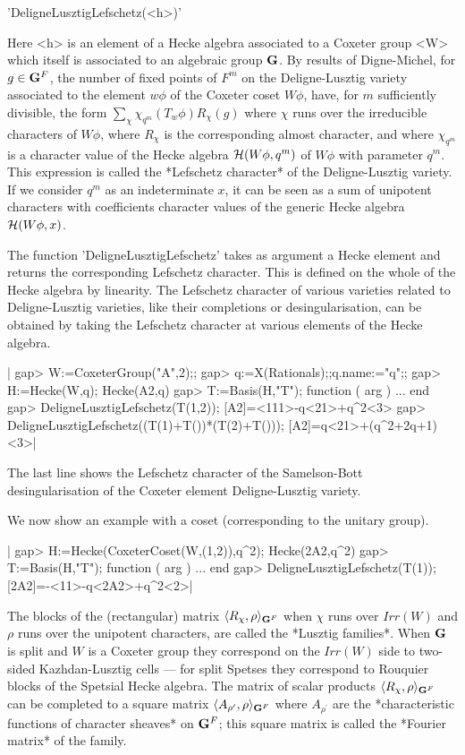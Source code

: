 'DeligneLusztigLefschetz(<h>)'

Here <h> is an element of a Hecke algebra associated to a Coxeter group <W>
which  itself  is  associated  to  an  algebraic group ${\bf G}$. By results of
Digne-Michel,  for $g\in{\bf G}^F$, the number of  fixed points of $F^m$ on the
Deligne-Lusztig  variety associated to  the element $w\phi$  of the Coxeter
coset  $W\phi$, have, for  $m$ sufficiently divisible,  the form $\sum_\chi
\chi_{q^m}(T_w\phi)R_\chi(g)$   where  $\chi$  runs  over  the  irreducible
characters   of  $W\phi$,  where  $R_\chi$   is  the  corresponding  almost
character, and where $\chi_{q^m}$ is a character value of the Hecke algebra
${\cal  H}(W\phi,q^m)$ of $W\phi$ with  parameter $q^m$. This expression is
called  the  *Lefschetz  character*  of  the Deligne-Lusztig variety. If we
consider  $q^m$  as  an  indeterminate  $x$,  it  can  be  seen as a sum of
unipotent  characters  with  coefficients  character  values of the generic
Hecke algebra ${\cal H}(W\phi,x)$.

The  function 'DeligneLusztigLefschetz'  takes as  argument a Hecke element
and  returns the corresponding Lefschetz character.  This is defined on the
whole of the Hecke algebra by linearity. The Lefschetz character of various
varieties  related to Deligne-Lusztig varieties,  like their completions or
desingularisation,  can be  obtained by  taking the  Lefschetz character at
various elements of the Hecke algebra.

|    gap> W:=CoxeterGroup("A",2);;
    gap> q:=X(Rationals);;q.name:="q";;
    gap> H:=Hecke(W,q);
    Hecke(A2,q)
    gap> T:=Basis(H,"T");
    function ( arg ) ... end
    gap> DeligneLusztigLefschetz(T(1,2));
    [A2]=<111>-q<21>+q^2<3>
    gap> DeligneLusztigLefschetz((T(1)+T())*(T(2)+T()));
    [A2]=q<21>+(q^2+2q+1)<3>|

The   last  line  shows  the   Lefschetz  character  of  the  Samelson-Bott
desingularisation of the Coxeter element Deligne-Lusztig variety.

We now show an example with a coset (corresponding to the unitary group).

|    gap> H:=Hecke(CoxeterCoset(W,(1,2)),q^2);
    Hecke(2A2,q^2)
    gap> T:=Basis(H,"T");
    function ( arg ) ... end
    gap> DeligneLusztigLefschetz(T(1));
    [2A2]=-<11>-q<2A2>+q^2<2>|


The blocks of the (rectangular) matrix $\langle R_\chi,\rho\rangle_{{\bf G}^F}$
when  $\chi$  runs  over  $Irr(W)$  and  $\rho$  runs  over  the  unipotent
characters,  are called the *Lusztig families*. When ${\bf G}$ is split and $W$
is  a  Coxeter  group  they  correspond  on  the $Irr(W)$ side to two-sided
Kazhdan-Lusztig  cells ---  for split  Spetses they  correspond to Rouquier
blocks  of  the  Spetsial  Hecke  algebra.  The  matrix  of scalar products
$\langle  R_\chi,\rho\rangle_{{\bf G}^F}$ can  be completed  to a square matrix
$\langle  A_{\rho^\prime},\rho\rangle_{{\bf G}^F}$ where  $A_{\rho^\prime}$ are
the *characteristic functions of character sheaves* on ${\bf G}^F$; this square
matrix is called the *Fourier matrix* of the family.

